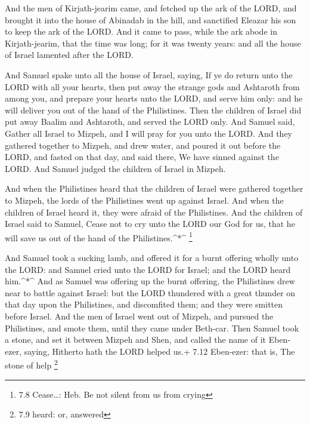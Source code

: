  And the men of Kirjath-jearim came, and fetched up the ark
of the LORD, and brought it into the house of Abinadab in the hill, and
sanctified Eleazar his son to keep the ark of the LORD.  And
it came to pass, while the ark abode in Kirjath-jearim, that the time
was long; for it was twenty years: and all the house of Israel lamented
after the LORD.

 And Samuel spake unto all the house of Israel, saying, If
ye do return unto the LORD with all your hearts, then put away the
strange gods and Ashtaroth from among you, and prepare your hearts unto
the LORD, and serve him only: and he will deliver you out of the hand of
the Philistines.  Then the children of Israel did put away
Baalim and Ashtaroth, and served the LORD only.  And Samuel
said, Gather all Israel to Mizpeh, and I will pray for you unto the
LORD.  And they gathered together to Mizpeh, and drew water,
and poured it out before the LORD, and fasted on that day, and said
there, We have sinned against the LORD. And Samuel judged the children
of Israel in Mizpeh.

 And when the Philistines heard that the children of Israel
were gathered together to Mizpeh, the lords of the Philistines went up
against Israel. And when the children of Israel heard it, they were
afraid of the Philistines.  And the children of Israel said
to Samuel, Cease not to cry unto the LORD our God for us, that he will
save us out of the hand of the Philistines.\^{}*\^{} \footnote{7.8
  Cease\ldots: Heb. Be not silent from us from crying}

 And Samuel took a sucking lamb, and offered it for a burnt
offering wholly unto the LORD: and Samuel cried unto the LORD for
Israel; and the LORD heard him.\^{}*\^{}  And as Samuel was
offering up the burnt offering, the Philistines drew near to battle
against Israel: but the LORD thundered with a great thunder on that day
upon the Philistines, and discomfited them; and they were smitten before
Israel.  And the men of Israel went out of Mizpeh, and
pursued the Philistines, and smote them, until they came under Beth-car.
 Then Samuel took a stone, and set it between Mizpeh and
Shen, and called the name of it Eben-ezer, saying, Hitherto hath the
LORD helped us.+ 7.12 Eben-ezer: that is, The stone of help \footnote{7.9
  heard: or, answered}


